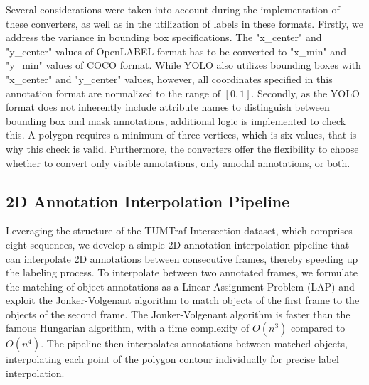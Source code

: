 Several considerations were taken into account during the implementation of these converters, as well as in the utilization of labels in these formats. Firstly, we address the variance in bounding box specifications. The "x\_center" and  "y\_center" values of OpenLABEL format has to be converted to "x\_min" and  "y\_min" values of COCO format. While YOLO also utilizes bounding boxes with "x\_center" and  "y\_center" values, however, all coordinates specified in this annotation format are normalized to the range of $[0,1]$. Secondly, as the YOLO format does not inherently include attribute names to distinguish between bounding box and mask annotations, additional logic is implemented to check this.  A polygon requires a minimum of three vertices, which is six values, that is why this check is valid. Furthermore, the converters offer the flexibility to choose whether to convert only visible annotations, only amodal annotations, or both.

\subsection{2D Annotation Interpolation Pipeline}  \label{sec:2d_interpolation_pipeline}

Leveraging the structure of the TUMTraf Intersection dataset, which comprises eight sequences, we develop a simple 2D annotation interpolation pipeline that can interpolate 2D annotations between consecutive frames, thereby speeding up the labeling process. To interpolate between two annotated frames, we formulate the matching of object annotations as a Linear Assignment Problem (LAP) and exploit the Jonker-Volgenant algorithm to match objects of the first frame to the objects of the second frame. The Jonker-Volgenant algorithm \cite{Jonker_Volgenant} is faster than the famous Hungarian algorithm, with a time complexity of $O(n^3)$ compared to $O(n^4)$. The pipeline then interpolates annotations between matched objects, interpolating each point of the polygon contour individually for precise label interpolation.

